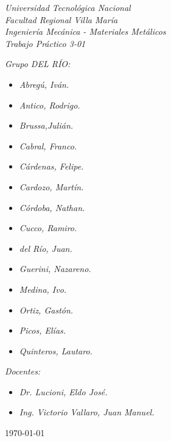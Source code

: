 \begin{titlepage}
	
	\begin{center}
		{\huge \textit{Universidad Tecnológica Nacional}}\\
        \vspace{0.5cm}
		{\LARGE \textit{Facultad Regional Villa María}}\\
		\vspace{1.5cm}
        {\LARGE{\textit{Ingeniería Mecánica - Materiales Metálicos}}}\\
		\vspace{1.5cm}
        \LARGE{\textit{Trabajo Práctico 3-01}}
	\end{center}
	
	\vfill

    \textit{Grupo DEL RÍO:}
	\begin{itemize}
		\item \textit{Abregú, Iván.}
		\item \textit{Antico, Rodrigo.}
		\item \textit{Brussa,Julián.}
		\item \textit{Cabral, Franco.}
        \item \textit{Cárdenas, Felipe.}
        \item \textit{Cardozo, Martín.}
        \item \textit{Córdoba, Nathan.}
        \item \textit{Cucco, Ramiro.}
        \item \textit{del Río, Juan.}
        \item \textit{Guerini, Nazareno.}
        \item \textit{Medina, Ivo.}
        \item \textit{Ortiz, Gastón.}
        \item \textit{Picos, Elías.}
        \item \textit{Quinteros, Lautaro.}
	\end{itemize}
    
	\textit{Docentes:}
	\begin{itemize}
		\item \textit{Dr. Lucioni, Eldo José.}
		\item \textit{Ing. Victorio Vallaro, Juan Manuel.}
	\end{itemize}
	\centering
	\today
	
\end{titlepage}
